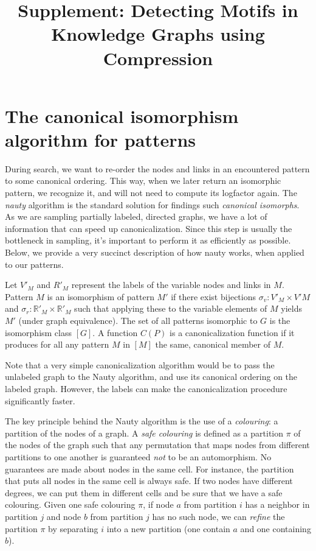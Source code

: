 \documentclass[letterpaper]{article} %
\title{Supplement: Detecting Motifs in Knowledge Graphs using Compression}
\newcommand{\R}{{\mathbb R}}
\begin{document}
\maketitle 
\section{The canonical isomorphism algorithm for patterns}

During search, we want to re-order the nodes and links in an encountered pattern to some canonical ordering. This way, when we later return an isomorphic pattern, we recognize it, and will not need to compute its logfactor again. 
The \emph{nauty} algorithm is the standard solution for findings such \emph{canonical isomorphs}. As we are sampling partially labeled, directed graphs, we have a lot of information that can speed up canonicalization. Since this step is usually the bottleneck in sampling, it's important to perform it as efficiently as possible. Below, we provide a very succinct description of how nauty works, when applied to our patterns.

Let $V'_M$ and $R'_M$ represent the labels of the variable nodes and links in $M$. Pattern $M$ is an isomorphism of pattern $M'$ if there exist bijections $\sigma_v : V'_M \times V'M$ and $\sigma_r: \R'_M \times \R'_M$ such that applying these to the variable elements of $M$ yields $M'$ (under graph equivalence). The set of all patterns isomorphic to $G$ is the isomorphism class $[G]$. A function $C(P)$ is a canonicalization function if it produces for all any pattern $M$ in $[M]$ the same, canonical member of $M$.

Note that a very simple canonicalization algorithm would be to pass the unlabeled graph to the Nauty algorithm, and use its canonical ordering on the labeled graph. However, the labels can make the canonicalization procedure significantly faster.

The key principle behind the Nauty algorithm is the use of a \emph{colouring}: a partition of the nodes of a graph. A \emph{safe colouring} is defined as a partition $\pi$ of the nodes of the graph such that any permutation that maps nodes from different partitions to one another is guaranteed \emph{not} to be an automorphism. No guarantees are made about nodes in the same cell. For instance, the partition that puts all nodes in the same cell is always safe. If two nodes have different degrees, we can put them in different cells and be sure that we have a safe colouring. Given one safe colouring $\pi$, if node $a$ from partition $i$ has a neighbor in partition $j$ and node $b$ from partition $j$ has no such node, we can \emph{refine} the partition $\pi$ by separating $i$ into a new partition (one contain $a$ and one containing $b$). 
\end{document}
